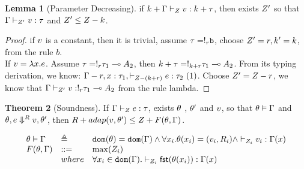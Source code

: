 \documentclass[a4paper,11pt]{article}
\theoremstyle{definition}
\newtheorem{thm}{Theorem}
\newtheorem{lem}[thm]{Lemma}
\begin{document}
\begin{lem}[Parameter Decreasing]
  \label{para-dec}
  if  $k+\Gamma \vdash_{Z} v : k+ \tau  $, then exists 
  $Z'$ so
  that   $\Gamma \vdash_{Z' } v :
  \tau$ and  $Z' \leq Z-k $.
\end{lem}
\begin{proof}
  if $v$ is a constant, then it is trivial, assume $\tau =
  !_{r} \mathtt{b}$, choose
  $Z' = r, k'=k$, from the rule $b$.  \\
  If $v = \lambda
  x. e$. Assume $\tau = !_{r} \tau_1 \multimap A_2 $, then $k+\tau =
  !_{k+r} \tau_1 \multimap A_2 $. From its typing derivation, we know: $\Gamma-r, x: \tau_1, 
   \vdash_{Z - (k+r) } e: \tau_2 ~(1)$. Choose $Z' =
   Z -r$, we know that $\Gamma  \vdash_{Z' } v :
  !_{r} \tau_1 \multimap A_2$ from the rule lambda.
\end{proof}

\begin{thm}[Soundness]
If $\Gamma \vdash_{Z} e : \tau$, exists $\theta$ , $\theta'$ and $v$,
so that $\theta \vDash \Gamma$ and $\theta , e \mathrel{\Downarrow^{R}} v,
\theta'  $, then  $ R + adap(v, \theta')  \leq  Z + F(\theta,\Gamma)$.  
\end{thm}
\[
  \begin{array}{lll}
     \env \vDash \Gamma &\triangleq  &  \dom(\env) = \dom(\Gamma)
                                       \land \forall x_i. \env(x_i) =
                                       (\valr_i, \adapt_i) \land
                                       \empty \tvdash{\nnatA_i} \valr_i
                                       : \Gamma(x)   \\
    F(\env,\Gamma) & ::= &  \max(\nnatA_i)    \\
    & where &   \forall x_i \in \dom(\Gamma). \empty \tvdash{\nnatA_i}
              \mathsf{fst} (\env(x_i) )
                                       : \Gamma(x)   \\
    \end{array}
\]
\end{document}
